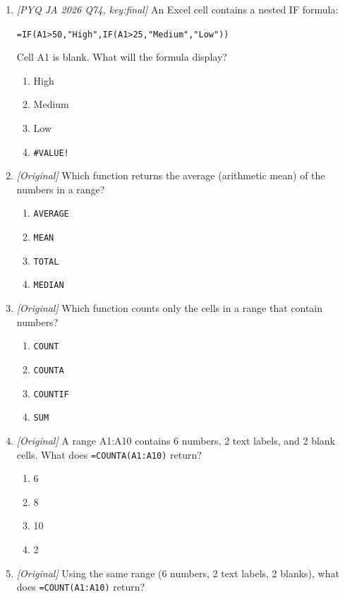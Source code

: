 \begin{enumerate}[label=\textbf{Q\arabic*.}, leftmargin=*]
\item \textit{[PYQ JA 2026 Q74, key:final]} An Excel cell contains a nested IF
  formula:
  \begin{center}
    \texttt{=IF(A1>50,"High",IF(A1>25,"Medium","Low"))}
  \end{center}
  Cell A1 is blank. What will the formula display? 
  \begin{enumerate}[label=\Alph*.]
    \item High
    \item Medium
    \item Low
    \item \texttt{\#VALUE!}
  \end{enumerate}
\item \textit{[Original]} Which function returns the average (arithmetic mean)
  of the numbers in a range?
  \begin{enumerate}[label=\Alph*.]
    \item \texttt{AVERAGE}
    \item \texttt{MEAN}
    \item \texttt{TOTAL}
    \item \texttt{MEDIAN}
  \end{enumerate}
\item \textit{[Original]} Which function counts only the cells in a range that
  contain numbers?
  \begin{enumerate}[label=\Alph*.]
    \item \texttt{COUNT}
    \item \texttt{COUNTA}
    \item \texttt{COUNTIF}
    \item \texttt{SUM}
  \end{enumerate}
\item \textit{[Original]} A range A1:A10 contains 6 numbers, 2 text labels,
  and 2 blank cells. What does \texttt{=COUNTA(A1:A10)} return?
  \begin{enumerate}[label=\Alph*.]
    \item 6
    \item 8
    \item 10
    \item 2
  \end{enumerate}
\item \textit{[Original]} Using the same range (6 numbers, 2 text labels, 2
  blanks), what does \texttt{=COUNT(A1:A10)} return?
  \begin{enumerate}[label=\Alph*.]

\end{enumerate}
\end{enumerate}
